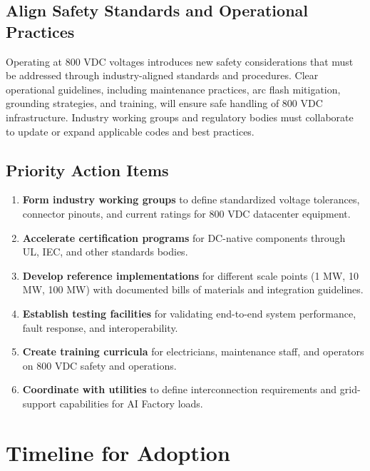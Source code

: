 \subsection*{Align Safety Standards and Operational Practices}

Operating at 800 VDC voltages introduces new safety considerations that must be addressed through industry-aligned standards and procedures. Clear operational guidelines, including maintenance practices, arc flash mitigation, grounding strategies, and training, will ensure safe handling of 800 VDC infrastructure. Industry working groups and regulatory bodies must collaborate to update or expand applicable codes and best practices.

\subsection*{Priority Action Items}

\begin{enumerate}
\item \textbf{Form industry working groups} to define standardized voltage tolerances, connector pinouts, and current ratings for 800 VDC datacenter equipment.

\item \textbf{Accelerate certification programs} for DC-native components through UL, IEC, and other standards bodies.

\item \textbf{Develop reference implementations} for different scale points (1 MW, 10 MW, 100 MW) with documented bills of materials and integration guidelines.

\item \textbf{Establish testing facilities} for validating end-to-end system performance, fault response, and interoperability.

\item \textbf{Create training curricula} for electricians, maintenance staff, and operators on 800 VDC safety and operations.

\item \textbf{Coordinate with utilities} to define interconnection requirements and grid-support capabilities for AI Factory loads.
\end{enumerate}

\section*{Timeline for Adoption}


